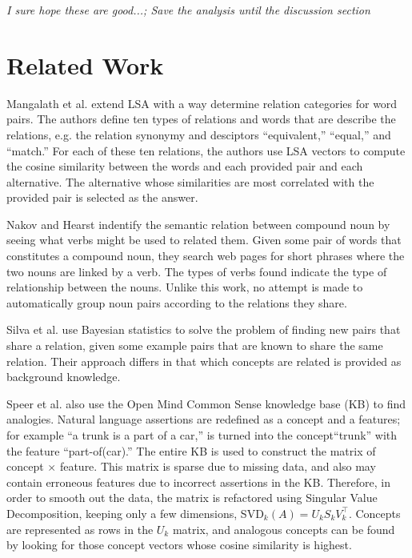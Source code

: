 \documentclass[11pt]{article}
\begin{document}
\emph{I sure hope these are good...; Save the analysis until the discussion
  section}

\section{Related Work}
\label{sec:related}


Mangalath et al. extend LSA\cite{landauer88introduction} with a way determine
relation categories for word pairs\cite{mangalath04analogy}.  The authors define
ten types of relations and words that are describe the relations, e.g. the
relation synonymy and desciptors ``equivalent,'' ``equal,'' and ``match.''  For
each of these ten relations, the authors use LSA vectors to compute the cosine
similarity between the words and each provided pair and each alternative.  The
alternative whose similarities are most correlated with the provided pair is
selected as the answer.

Nakov and Hearst indentify the semantic relation between compound noun by seeing
what verbs might be used to related them\cite{nakov06using}.  Given some pair of
words that constitutes a compound noun, they search web pages for short phrases
where the two nouns are linked by a verb.  The types of verbs found indicate the
type of relationship between the nouns.  Unlike this work, no attempt is made to
automatically group noun pairs according to the relations they share. 

Silva et al. use Bayesian statistics to solve the problem of finding new pairs
that share a relation, given some example pairs that are known to share the same
relation\cite{silva07analogical}.  Their approach differs in that which concepts
are related is provided as background knowledge.  

Speer et al. also use the Open Mind Common Sense knowledge base (KB) to find
analogies\cite{speer08analogyspace}.  Natural language assertions are redefined
as a concept and a features; for example ``a trunk is a part of a car,'' is
turned into the concept``trunk'' with the feature ``part-of(car).''  The entire
KB is used to construct the matrix of concept $\times$ feature.  This matrix is
sparse due to missing data, and also may contain erroneous features due to
incorrect assertions in the KB.  Therefore, in order to smooth out the data, the
matrix is refactored using Singular Value Decomposition, keeping only a few
dimensions, SVD$_k(A) = U_kS_kV_k^{\top}$.  Concepts are represented as rows
in the $U_k$ matrix, and analogous concepts can be found by looking for those
concept vectors whose cosine similarity is highest.
\end{document}
